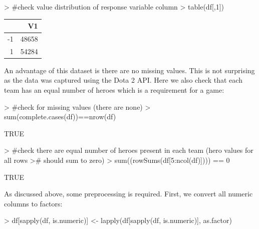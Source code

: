 \documentclass[10pt]{article}
\begin{document}
\hspace{1cm} 
\begin{Schunk}
\begin{Sinput}
> #check value distribution of response variable column
> table(df[,1])
\end{Sinput}
\end{Schunk}
\hspace{1cm} 

\begin{table}[ht]
\centering
\begin{tabular}{rr}
  \hline
 & V1 \\ 
  \hline
-1 & 48658 \\ 
  1 & 54284 \\ 
   \hline
\end{tabular}
\end{table}

An advantage of this dataset is there are no missing values. This is not surprising as the data was captured using the Dota 2 API. Here we also check that each team has an equal number of heroes which is a requirement for a game:
\hspace{1cm} 

\begin{Schunk}
\begin{Sinput}
> #check for missing values (there are none)
> sum(complete.cases(df))==nrow(df)
\end{Sinput}
\begin{Soutput}
[1] TRUE
\end{Soutput}
\begin{Sinput}
> #check there are equal number of heroes present in each team (hero values for all rows
># should sum to zero)
> sum((rowSums(df[5:ncol(df)]))) == 0
\end{Sinput}
\begin{Soutput}
[1] TRUE
\end{Soutput}
\end{Schunk}
\hspace{1cm} 

As discussed above, some preprocessing is required. First, we convert all numeric columns to factors:

\hspace{1cm} 
\begin{Schunk}
\begin{Sinput}
> df[sapply(df, is.numeric)] <- lapply(df[sapply(df, is.numeric)], as.factor)
\end{Sinput}
\end{Schunk}
\hspace{1cm} 
\end{document}
